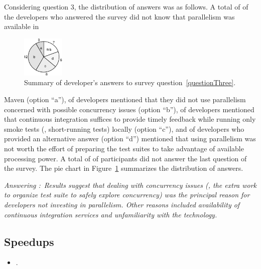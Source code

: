 Considering question 3, the distribution of answers was as follows.  A
total of \emailsA{} of the \emailsProjectsAnswered{} developers who
answered the survey did not know that parallelism was available in
\begin{figure}
  \centering
  \includegraphics[width=2cm]{results/survey.pdf}
  \caption{\label{fig:rq5-answers}Summary of developer's answers to
    survey question~\ref{questionThree}.}
\end{figure}
Maven (option ``a''), \emailsB{} of developers mentioned that they did
not use parallelism concerned with possible concurrency issues (option
``b''), \emailsD{} of developers mentioned that continuous integration
suffices to provide timely feedback while running only smoke
tests (\ie{}, short-running tests) locally (option ``c''), and \emailsD{} of
developers who provided an alternative answer (option ``d'') mentioned
that using parallelism was not worth the effort of preparing the test
suites to take advantage of available processing power.  A total of
\emailsNA{} of participants did not answer the last question of the
survey.  The pie chart in Figure~\ref{fig:rq5-answers} 
summarizes the distribution of answers.

\begin{mdframed}
\noindent\textit{Answering \numRQAdoptionTwo{}:}~\emph{Results suggest that dealing
  with concurrency issues (\ie{}, the extra work to organize test
  suite to safely explore concurrency) was the principal reason
  for developers not investing in parallelism.  Other reasons
  included availability of continuous integration services and
  unfamiliarity with the technology.}
\end{mdframed}

\subsection{Speedups}
\label{sec:rqD}

\begin{itemize}
    \item \numRQSpeedupOne{}. \textbf{\RQSpeedupOne}
\end{itemize}

